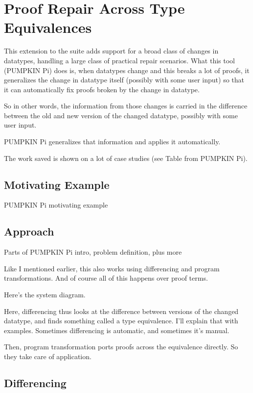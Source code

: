 \chapter{Proof Repair Across Type Equivalences}

This extension to the suite adds support for a broad class of changes in datatypes, handling a large class of practical repair scenarios.
What this tool (PUMPKIN Pi) does is, when datatypes change and this breaks a lot of proofs, it generalizes the change in datatype itself (possibly with some user input) so that it can automatically fix proofs broken by the change in datatype. 

So in other words, the information from those changes is carried in the difference between the old and new version of the changed datatype, possibly with some user input.

PUMPKIN Pi generalizes that information and applies it automatically.

The work saved is shown on a lot of case studies (see Table from PUMPKIN Pi).

\section{Motivating Example}

PUMPKIN Pi motivating example

\section{Approach}

Parts of PUMPKIN Pi intro, problem definition, plus more

Like I mentioned earlier, this also works using differencing and program transformations. And of course all of this happens over proof terms.

Here's the system diagram.

Here, differencing thus looks at the difference between versions of the changed datatype, and finds something called a type equivalence. I'll explain that with examples. Sometimes differencing is automatic, and sometimes it's manual.

Then, program transformation ports proofs across the equivalence directly. So they take care of application.

\section{Differencing}

